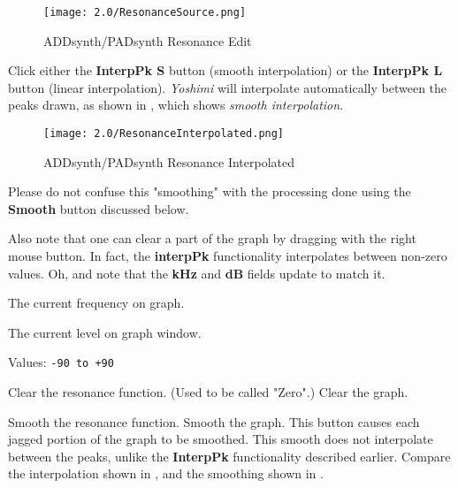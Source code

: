    \begin{figure}[H]
      \centering
      \texttt{[image: 2.0/ResonanceSource.png]}
      \caption{ADDsynth/PADsynth Resonance Edit}
      \label{fig:addsynth_resonance_edit}
   \end{figure}

   Click either the \textbf{InterpPk S} button (smooth interpolation) or the \textbf{InterpPk L}
   button (linear interpolation). \textsl{Yoshimi} will interpolate automatically between the peaks
   drawn, as shown in , which shows \textsl{smooth
   interpolation}.

   \begin{figure}[H]
      \centering
      \texttt{[image: 2.0/ResonanceInterpolated.png]}
      \caption{ADDsynth/PADsynth Resonance Interpolated}
      \label{fig:addsynth_resonance_interpolated}
   \end{figure}


   Please do not confuse this "smoothing" with the processing done using the
   \textbf{Smooth} button discussed below.

   Also note that one can clear a part of the graph
   by dragging with the right mouse button. In fact, the \textbf{interpPk}
   functionality interpolates between non-zero values.
   Oh, and note that the \textbf{kHz} and \textbf{dB} fields update to match it.

   The current frequency on graph.

   The current level on graph window.

   Values: \texttt{-90 to +90}

   Clear the resonance function.  (Used to be called "Zero".)
   Clear the graph.

   Smooth the resonance function.
   Smooth the graph.
   This button causes each jagged portion of the graph to be smoothed.
   This smooth does not interpolate between the peaks, unlike the
   \textbf{InterpPk} functionality described earlier.  Compare the
   interpolation shown in ,
   and the smoothing shown in .

